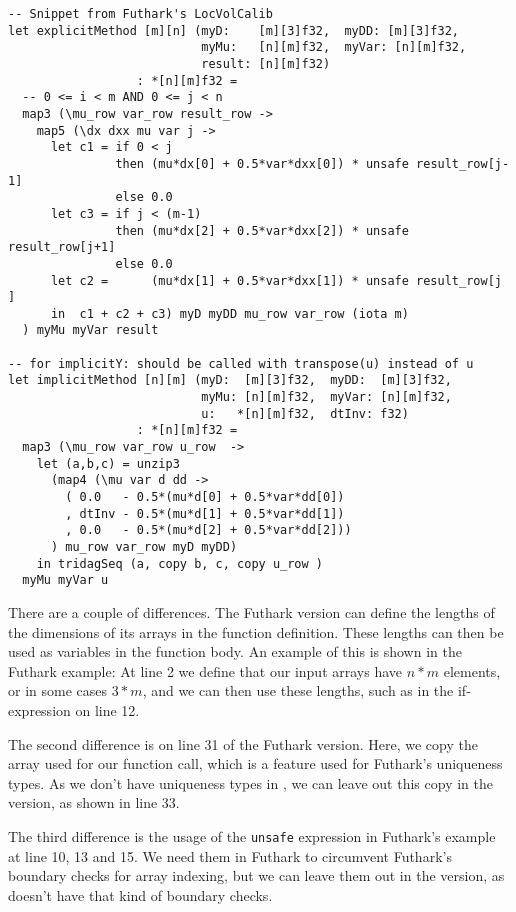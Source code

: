 \begin{lstlisting}[language=Futhark, basicstyle=\footnotesize\ttfamily]
-- Snippet from Futhark's LocVolCalib
let explicitMethod [m][n] (myD:    [m][3]f32,  myDD: [m][3]f32,
                           myMu:   [n][m]f32,  myVar: [n][m]f32,
                           result: [n][m]f32)
                  : *[n][m]f32 =
  -- 0 <= i < m AND 0 <= j < n
  map3 (\mu_row var_row result_row ->
    map5 (\dx dxx mu var j ->
      let c1 = if 0 < j
               then (mu*dx[0] + 0.5*var*dxx[0]) * unsafe result_row[j-1]
               else 0.0
      let c3 = if j < (m-1)
               then (mu*dx[2] + 0.5*var*dxx[2]) * unsafe result_row[j+1]
               else 0.0
      let c2 =      (mu*dx[1] + 0.5*var*dxx[1]) * unsafe result_row[j  ]
      in  c1 + c2 + c3) myD myDD mu_row var_row (iota m)
  ) myMu myVar result

-- for implicitY: should be called with transpose(u) instead of u
let implicitMethod [n][m] (myD:  [m][3]f32,  myDD:  [m][3]f32,
                           myMu: [n][m]f32,  myVar: [n][m]f32,
                           u:   *[n][m]f32,  dtInv: f32)
                  : *[n][m]f32 =
  map3 (\mu_row var_row u_row  ->
    let (a,b,c) = unzip3 
      (map4 (\mu var d dd ->
        ( 0.0   - 0.5*(mu*d[0] + 0.5*var*dd[0])
        , dtInv - 0.5*(mu*d[1] + 0.5*var*dd[1])
        , 0.0   - 0.5*(mu*d[2] + 0.5*var*dd[2]))
      ) mu_row var_row myD myDD)
    in tridagSeq (a, copy b, c, copy u_row )
  myMu myVar u
\end{lstlisting}
There are a couple of differences. The Futhark version can define the lengths of
the dimensions of its arrays in the function definition. These lengths can then
be used as variables in the function body. An example of this is shown in the
Futhark example: At line 2 we define that our input arrays have $n*m$ elements,
or in some cases $3*m$, and we can then use these lengths, such as in the
if-expression on line 12.

The second difference is on line 31 of the Futhark version. Here, we copy the
array used for our function call, which is a feature used for Futhark's
uniqueness types\cite{pldi17}.
As we don't have uniqueness types in \fshark{}, we can leave out this copy in
the \fshark{} version, as shown in line 33.

The third difference is the usage of the \texttt{unsafe} expression in Futhark's
example at line 10, 13 and 15. We need them in Futhark to circumvent Futhark's
boundary checks for array indexing, but we can leave them out in the \fshark{}
version, as \fshark{} doesn't have that kind of boundary checks.

